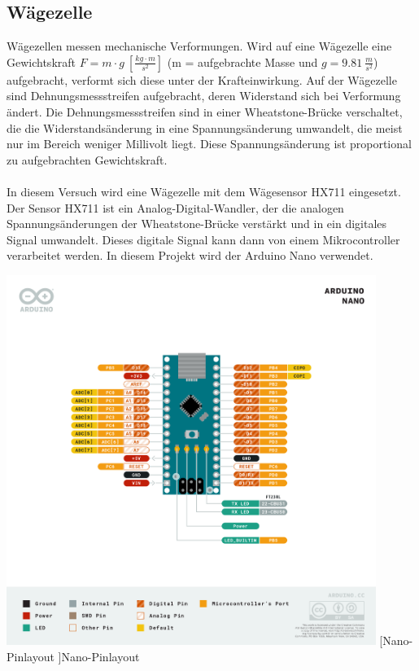 \subsection{Wägezelle}

Wägezellen messen mechanische Verformungen.
Wird auf eine Wägezelle eine Gewichtskraft \mbox{$F = m \cdot g \: [\frac{kg \cdot m}{s^2}]$} (m = aufgebrachte Masse und $g = 9.81 \: \frac{m}{s^2}$)  aufgebracht, verformt sich diese unter der Krafteinwirkung.
Auf der Wägezelle sind Dehnungsmessstreifen aufgebracht, deren Widerstand sich bei Verformung ändert.
Die Dehnungsmessstreifen sind in einer Wheatstone-Brücke verschaltet, die die Widerstandsänderung in eine Spannungsänderung umwandelt, die meist nur im Bereich weniger Millivolt liegt.
Diese Spannungsänderung ist proportional zu aufgebrachten Gewichtskraft.\\
\\
In diesem Versuch wird eine Wägezelle mit dem Wägesensor HX711 eingesetzt.
Der Sensor HX711 ist ein Analog-Digital-Wandler, der die analogen Spannungsänderungen der Wheatstone-Brücke verstärkt und in ein digitales Signal umwandelt.
Dieses digitale Signal kann dann von einem Mikrocontroller verarbeitet werden.
In diesem Projekt wird der Arduino Nano verwendet. \\
\begin{center}
    \centering
    \includegraphics[width=0.9\textwidth]{img/Nano-Pinlayout.png}
    [Nano-Pinlayout ]{Nano-Pinlayout \cite{Arduino}}\label{Nano-Pinlayout}
\end{center}


